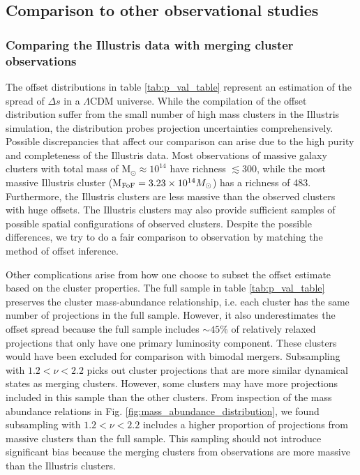 \subsection{Comparison to other observational studies}

\subsubsection{Comparing the Illustris data with merging cluster observations}

The offset distributions in table \ref{tab:p_val_table}
represent an estimation of the spread of $\Delta s$ in a $\Lambda$CDM universe.
While the compilation of the offset distribution suffer 
from the small number of high mass clusters in the Illustris simulation, 
the distribution probes projection uncertainties comprehensively. 
Possible discrepancies that affect our comparison can arise
due to the high purity and completeness of the Illustris data.
Most observations of massive galaxy clusters with total mass of M$_\odot
\approx 10^{14}$ have richness $\lesssim 300$, while the most massive Illustris
cluster (M$_{\rm FoF} = 3.23 \times 10^{14} M_\odot$) has a richness of 483.
Furthermore, the Illustris clusters are less massive than the observed clusters
with huge offsets. The Illustris clusters may also provide sufficient samples
of possible spatial configurations of observed clusters.
Despite the possible differences, we try to do a
fair comparison to observation by matching the method of offset inference. 

Other complications arise from how one choose to subset the offset estimate
based on the cluster properties.
The full sample in table \ref{tab:p_val_table} preserves the cluster mass-abundance
relationship, i.e. each cluster has the same number of projections in
the full sample. However, it also underestimates the offset spread because the
full sample includes $\sim 45\%$ of relatively relaxed projections 
that only have one primary luminosity component.  These clusters would
have been excluded for comparison with bimodal mergers. 
Subsampling with $1.2 < \nu < 2.2$ picks out
cluster projections that are more similar dynamical states as merging clusters. 
However, some clusters may have more projections included in this sample
than the other clusters. From inspection of the mass abundance relations in 
Fig. \ref{fig:mass_abundance_distribution}, we found subsampling with $1.2 <
\nu <2.2$ includes a higher proportion of projections from massive clusters than 
the full sample. This sampling should not introduce significant bias because
the merging clusters from observations are more massive than the Illustris 
clusters. 

